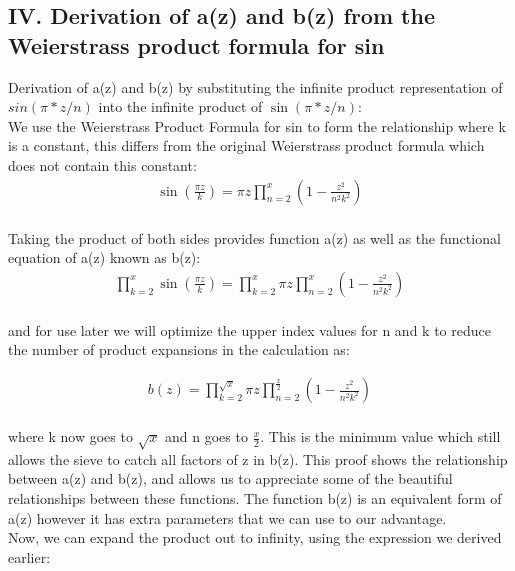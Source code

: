\newpage
\subsection*{IV. Derivation of a(z) and b(z) from the Weierstrass product formula for sin}
Derivation of a(z) and b(z) by substituting the infinite product representation of $sin(\pi*z/n)$ into the infinite product of $\sin(\pi*z/n)$: \\

We use the Weierstrass Product Formula for sin to form the relationship where k is a constant, this differs from the original Weierstrass product formula which does not contain this constant: \\
\begin{align*}
	\sin\left(\frac{\pi z}{k}\right) = \pi z\prod_{n=2}^x \left(1-\frac{z^2}{n^2k^2}\right) \\
\end{align*}

Taking the product of both sides provides function a(z) as well as the functional equation of a(z) known as b(z): \\
\begin{align*}
	\prod_{k=2}^x\sin\left(\frac{\pi z}{k}\right) = \prod_{k=2}^x \pi z\prod_{n=2}^x \left(1-\frac{z^2}{n^2k^2}\right) \\
\end{align*}

and for use later we will optimize the upper index values for n and k to reduce the number of product expansions in the calculation as:

\begin{align*}
	b(z) = \prod_{k=2}^{\sqrt{x}} \pi z\prod_{n=2}^{\frac{x}{2}} \left(1-\frac{z^2}{n^2k^2}\right) \\
\end{align*}

where k now goes to $\sqrt{x}$ and n goes to $\frac{x}{2}$. This is the minimum value which still allows the sieve to catch all factors of z in b(z). This proof shows the relationship between a(z) and b(z), and allows us to appreciate some of the beautiful relationships between these functions. The function b(z) is an equivalent form of a(z) however it has extra parameters that we can use to our advantage. \\

Now, we can expand the product out to infinity, using the expression we derived earlier:

